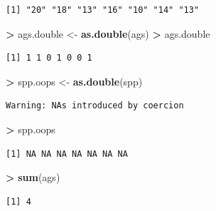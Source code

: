 \documentclass[]{krantz}
\makeatletter
\newenvironment{Shaded}{\begin{snugshade}}{\end{snugshade}}
\newcommand{\KeywordTok}[1]{\textcolor[rgb]{0.27,0.27,0.27}{\textbf{#1}}}
\newcommand{\NormalTok}[1]{#1}
\newcommand{\OperatorTok}[1]{\textcolor[rgb]{0.43,0.43,0.43}{\textbf{#1}}}
\newcommand{\StringTok}[1]{\textcolor[rgb]{0.5,0.5,0.5}{#1}}
\newenvironment{kframe}{%
\medskip{}
\setlength{\fboxsep}{.8em}
 \def\at@end@of@kframe{}%
 \ifinner\ifhmode%
  \def\at@end@of@kframe{\end{minipage}}%
  \begin{minipage}{\columnwidth}%
 \fi\fi%
 \def\FrameCommand##1{\hskip\@totalleftmargin \hskip-\fboxsep
 \colorbox{shadecolor}{##1}\hskip-\fboxsep
     \hskip-\linewidth \hskip-\@totalleftmargin \hskip\columnwidth}%
 \MakeFramed {\advance\hsize-\width
   \@totalleftmargin\z@ \linewidth\hsize
   \@setminipage}}%
 {\par\unskip\endMakeFramed%
 \at@end@of@kframe}
\renewenvironment{Shaded}{\begin{kframe}}{\end{kframe}}
\makeatother
\begin{document}
\begin{verbatim}
[1] "20" "18" "13" "16" "10" "14" "13"
\end{verbatim}

\begin{Shaded}
\begin{Highlighting}[]
\OperatorTok{>}\StringTok{ }\NormalTok{ags.double <-}\StringTok{ }\KeywordTok{as.double}\NormalTok{(ags)}
\OperatorTok{>}\StringTok{ }\NormalTok{ags.double}
\end{Highlighting}
\end{Shaded}

\begin{verbatim}
[1] 1 1 0 1 0 0 1
\end{verbatim}

\begin{Shaded}
\begin{Highlighting}[]
\OperatorTok{>}\StringTok{ }\NormalTok{spp.oops <-}\StringTok{ }\KeywordTok{as.double}\NormalTok{(spp)}
\end{Highlighting}
\end{Shaded}

\begin{verbatim}
Warning: NAs introduced by coercion
\end{verbatim}

\begin{Shaded}
\begin{Highlighting}[]
\OperatorTok{>}\StringTok{ }\NormalTok{spp.oops}
\end{Highlighting}
\end{Shaded}

\begin{verbatim}
[1] NA NA NA NA NA NA NA
\end{verbatim}

\begin{Shaded}
\begin{Highlighting}[]
\OperatorTok{>}\StringTok{ }\KeywordTok{sum}\NormalTok{(ags)}
\end{Highlighting}
\end{Shaded}

\begin{verbatim}
[1] 4
\end{verbatim}
\end{document}
